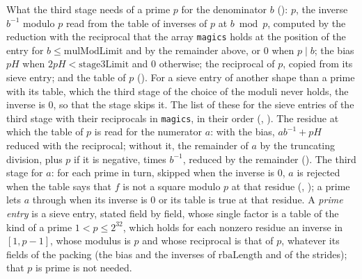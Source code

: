 \begin{definition}\label{def:stage3}
  \leanok
  What the third stage needs of a prime $p$ for the denominator $b$
  (): $p$, the inverse $b^{-1}$ modulo $p$ read from the table of
  inverses of $p$ at $b \bmod p$, computed by the reduction with the reciprocal that the array
  \verb|magics| holds at the position of the entry for $b \le \mathrm{mulModLimit}$ and by the
  remainder above, or $0$ when $p \mid b$; the bias $p H$ when $2 p H < \mathrm{stage3Limit}$ and
  $0$ otherwise; the reciprocal of $p$, copied from its sieve entry; and the table of $p$
  (). For a sieve entry of another shape than a prime with its table,
  which the third stage of the choice of the moduli never holds, the inverse is $0$, so that the
  stage skips it. The list of these for the sieve entries of the third stage with their reciprocals
  in \verb|magics|, in their order (, ). The
  residue at which the table of $p$ is read for the numerator $a$: with the bias, $a b^{-1} + p H$
  reduced with the reciprocal; without it, the remainder of $a$ by the truncating division, plus $p$
  if it is negative, times $b^{-1}$, reduced by the remainder (). The
  third stage for $a$: for each prime in turn, skipped when the inverse is $0$, $a$ is rejected when
  the table says that $f$ is not a square modulo $p$ at that residue (,
  ); a prime lets $a$ through when its inverse is $0$ or its table is true
  at that residue. A \emph{prime entry} is a sieve entry, stated field by field, whose single factor
  is a table of the kind of a prime $1 < p \le 2^{32}$, which holds for each nonzero residue an
  inverse in $[1, p - 1]$, whose modulus is $p$ and whose reciprocal is that of $p$, whatever its
  fields of the packing (the bias and the inverses of $\mathrm{rbaLength}$ and of the strides); that
  $p$ is prime is not needed.
\end{definition}

